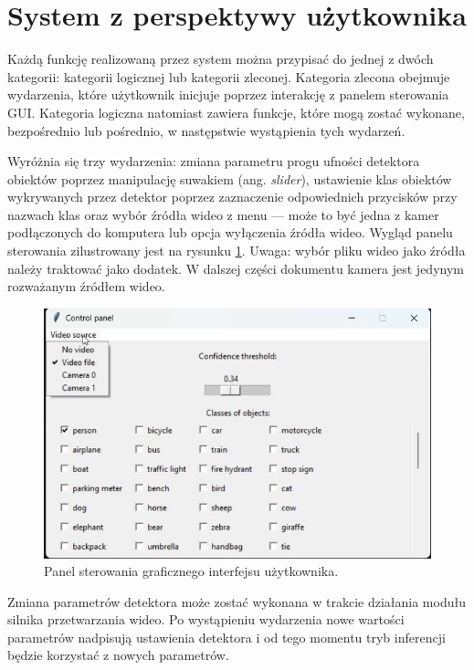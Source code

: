 \section{System z perspektywy użytkownika}
\label{chap:uzytkownik-gui}
Każdą funkcję realizowaną przez system można przypisać do jednej z dwóch kategorii: kategorii logicznej lub kategorii zleconej. Kategoria zlecona obejmuje wydarzenia, które użytkownik inicjuje poprzez interakcję z panelem sterowania GUI. Kategoria logiczna natomiast zawiera funkcje, które mogą zostać wykonane, bezpośrednio lub pośrednio, w następstwie wystąpienia tych wydarzeń.

Wyróżnia się trzy wydarzenia: zmiana parametru progu ufności detektora obiektów poprzez manipulację suwakiem (ang. \emph{slider}), ustawienie klas obiektów wykrywanych przez detektor poprzez zaznaczenie odpowiednich przycisków przy nazwach klas oraz wybór źródła wideo z menu --- może to być jedna z kamer podłączonych do komputera lub opcja wyłączenia źródła wideo. Wygląd panelu sterowania zilustrowany jest na rysunku \ref{fig:panel-sterowania}. 
Uwaga: wybór pliku wideo jako źródła należy traktować jako dodatek. W dalszej części dokumentu kamera jest jedynym rozważanym źródłem wideo.   

\begin{figure}[H]
    \centering
    \includegraphics[width=\linewidth]{r_implementacja/panel_sterowania/panel.jpg}
    \caption{Panel sterowania graficznego interfejsu użytkownika.}
    \label{fig:panel-sterowania}
\end{figure}

Zmiana parametrów detektora może zostać wykonana w trakcie działania modułu silnika przetwarzania wideo. Po wystąpieniu wydarzenia nowe wartości parametrów nadpisują ustawienia detektora i od tego momentu tryb inferencji będzie korzystać z nowych parametrów.

